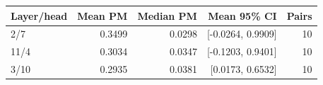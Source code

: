 \begin{tabular}{lrrrr}
\toprule
Layer/head & Mean PM & Median PM & Mean 95\% CI & Pairs \\
\midrule
2/7 & 0.3499 & 0.0298 & [-0.0264, 0.9909] & 10 \\
11/4 & 0.3034 & 0.0347 & [-0.1203, 0.9401] & 10 \\
3/10 & 0.2935 & 0.0381 & [0.0173, 0.6532] & 10 \\
\bottomrule
\end{tabular}
